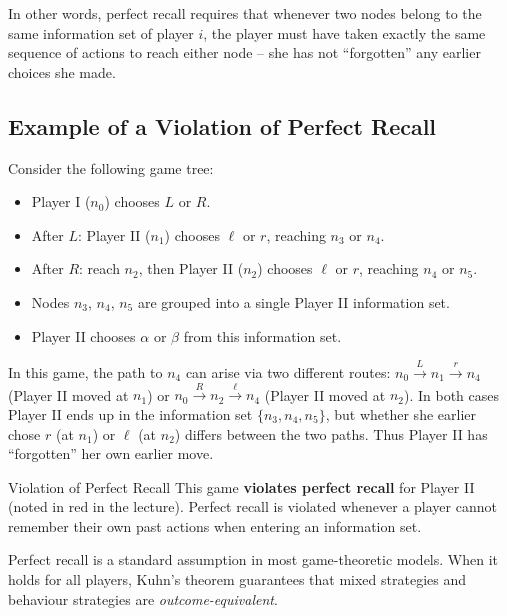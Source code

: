 \documentclass[12pt, a4paper]{article}
\begin{document}
In other words, perfect recall requires that whenever two nodes belong to the same information set of player $i$, the player must have taken exactly the same sequence of actions to reach either node -- she has not ``forgotten'' any earlier choices she made.

\subsection{Example of a Violation of Perfect Recall}

Consider the following game tree:
\begin{itemize}
  \item Player I ($n_0$) chooses $L$ or $R$.
  \item After $L$: Player II ($n_1$) chooses $\ell$ or $r$, reaching $n_3$ or $n_4$.
  \item After $R$: reach $n_2$, then Player II ($n_2$) chooses $\ell$ or $r$, reaching $n_4$ or $n_5$.
  \item Nodes $n_3$, $n_4$, $n_5$ are grouped into a single Player II information set.
  \item Player II chooses $\alpha$ or $\beta$ from this information set.
\end{itemize}

In this game, the path to $n_4$ can arise via two different routes: $n_0 \xrightarrow{L} n_1 \xrightarrow{r} n_4$ (Player II moved at $n_1$) or $n_0 \xrightarrow{R} n_2 \xrightarrow{\ell} n_4$ (Player II moved at $n_2$). In both cases Player II ends up in the information set $\{n_3, n_4, n_5\}$, but whether she earlier chose $r$ (at $n_1$) or $\ell$ (at $n_2$) differs between the two paths. Thus Player II has ``forgotten'' her own earlier move.

\begin{warnbox}{Violation of Perfect Recall}
This game \textbf{violates perfect recall} for Player II (noted in red in the lecture). Perfect recall is violated whenever a player cannot remember their own past actions when entering an information set.
\end{warnbox}

\begin{notebox}
Perfect recall is a standard assumption in most game-theoretic models. When it holds for all players, Kuhn's theorem guarantees that mixed strategies and behaviour strategies are \emph{outcome-equivalent}.
\end{notebox}
\end{document}
